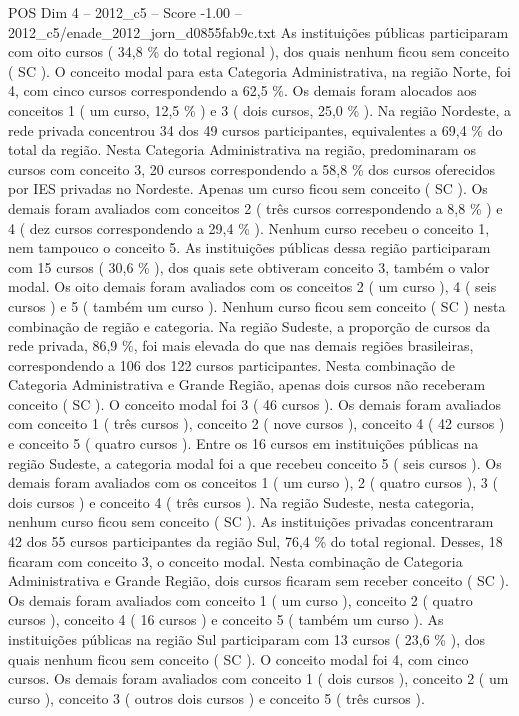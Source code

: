 \begin{textsample}{POS Dim 4 – 2012\_c5 – Score -1.00 – 2012\_c5/enade\_2012\_jorn\_d0855fab9c.txt}
As instituições públicas participaram com oito cursos ( 34,8 \% do total regional ), dos quais nenhum ficou sem conceito ( SC ).
O conceito modal para esta Categoria Administrativa, na região Norte, foi 4, com cinco cursos correspondendo a 62,5 \%.
Os demais foram alocados aos conceitos 1 ( um curso, 12,5 \% ) e 3 ( dois cursos, 25,0 \% ).
Na região Nordeste, a rede privada concentrou 34 dos 49 cursos participantes, equivalentes a 69,4 \% do total da região.
Nesta Categoria Administrativa na região, predominaram os cursos com conceito 3, 20 cursos correspondendo a 58,8 \% dos cursos oferecidos por IES privadas no Nordeste.
Apenas um curso ficou sem conceito ( SC ).
Os demais foram avaliados com conceitos 2 ( três cursos correspondendo a 8,8 \% ) e 4 ( dez cursos correspondendo a 29,4 \% ).
Nenhum curso recebeu o conceito 1, nem tampouco o conceito 5.
As instituições públicas dessa região participaram com 15 cursos ( 30,6 \% ), dos quais sete obtiveram conceito 3, também o valor modal.
Os oito demais foram avaliados com os conceitos 2 ( um curso ), 4 ( seis cursos ) e 5 ( também um curso ).
Nenhum curso ficou sem conceito ( SC ) nesta combinação de região e categoria.
Na região Sudeste, a proporção de cursos da rede privada, 86,9 \%, foi mais elevada do que nas demais regiões brasileiras, correspondendo a 106 dos 122 cursos participantes.
Nesta combinação de Categoria Administrativa e Grande Região, apenas dois cursos não receberam conceito ( SC ).
O conceito modal foi 3 ( 46 cursos ).
Os demais foram avaliados com conceito 1 ( três cursos ), conceito 2 ( nove cursos ), conceito 4 ( 42 cursos ) e conceito 5 ( quatro cursos ).
Entre os 16 cursos em instituições públicas na região Sudeste, a categoria modal foi a que recebeu conceito 5 ( seis cursos ).
Os demais foram avaliados com os conceitos 1 ( um curso ), 2 ( quatro cursos ), 3 ( dois cursos ) e conceito 4 ( três cursos ).
Na região Sudeste, nesta categoria, nenhum curso ficou sem conceito ( SC ).
As instituições privadas concentraram 42 dos 55 cursos participantes da região Sul, 76,4 \% do total regional.
Desses, 18 ficaram com conceito 3, o conceito modal.
Nesta combinação de Categoria Administrativa e Grande Região, dois cursos ficaram sem receber conceito ( SC ).
Os demais foram avaliados com conceito 1 ( um curso ), conceito 2 ( quatro cursos ), conceito 4 ( 16 cursos ) e conceito 5 ( também um curso ).
As instituições públicas na região Sul participaram com 13 cursos ( 23,6 \% ), dos quais nenhum ficou sem conceito ( SC ).
O conceito modal foi 4, com cinco cursos.
Os demais foram avaliados com conceito 1 ( dois cursos ), conceito 2 ( um curso ), conceito 3 ( outros dois cursos ) e conceito 5 ( três cursos ).

\end{textsample}
